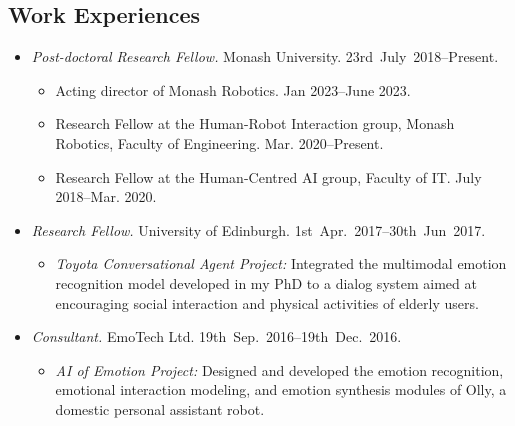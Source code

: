 \documentclass[11pt,letterpaper]{article}
\begin{document}
\subsection*{Work Experiences}
\begin{itemize}
  \item \emph{Post-doctoral Research Fellow.} Monash University. 23rd~July~2018--Present.
  \begin{itemize}
  	\item Acting director of Monash Robotics. Jan 2023--June 2023.
  	\item Research Fellow at the Human-Robot Interaction group, Monash Robotics, Faculty of Engineering. Mar. 2020--Present.
  	\item Research Fellow at the Human-Centred AI group, Faculty of IT. July 2018--Mar. 2020.
  \end{itemize}
  \item \emph{Research Fellow.} University of Edinburgh. 1st~Apr.~2017--30th~Jun~2017.
  \begin{itemize}
    \item \emph{Toyota Conversational Agent Project:} Integrated the multimodal emotion recognition model developed in my PhD to a dialog system aimed at encouraging social interaction and physical activities of elderly users.
  \end{itemize}
  \item \emph{Consultant.} EmoTech Ltd. 19th~Sep.~2016--19th~Dec.~2016.
  \begin{itemize}
    \item \emph{AI of Emotion Project:} Designed and developed the emotion recognition, emotional interaction modeling, and emotion synthesis modules of Olly, a domestic personal assistant robot. 
  \end{itemize}

\end{itemize}
\end{document}
